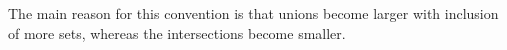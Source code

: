 \documentclass[preview]{standalone}
\begin{document}
\begin{center}
The main reason for this convention is that unions become larger with inclusion of more sets, whereas the intersections become smaller.
\end{center}
\end{document}

